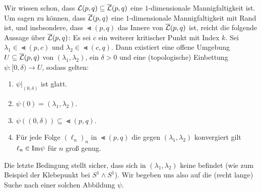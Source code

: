 \begin{bigproof}
    Wir wissen schon, dass ${ \mathcal{L} } (p, q) \subseteq {\overline{\mathcal{L}} }(p, q)$ eine $1$-dimensionale Mannigfaltigkeit ist. 
    Um sagen zu können, dass ${\overline{\mathcal{L}} } (p, q)$ eine $1$-dimensionale Mannigfaltigkeit mit Rand ist, und 
    insbsondere, dass $\Lt (p, q)$ das Innere von ${\overline{\mathcal{L}} }(p, q)$ ist, reicht die folgende Aussage über 
    ${\overline{\mathcal{L}} }(p, q)$:
    Es sei $c$ ein weiterer kritischer Punkt mit Index $k$.
    Sei $\lambda_1 \in \Lt (p, c)$ und $\lambda_2 \in \Lt (c, q)$. Dann existiert eine offene Umgebung
    $U \subseteq {\overline{\mathcal{L}} } (p, q)$ von $(\lambda_1, \lambda_2)$, ein $\delta > 0$ und eine (topologische)
    Einbettung $\psi \colon [0, \delta) \to U$, sodass gelten: 
    \begin{enumerate}
        \item $\psi|_{(0, \delta)}$ ist glatt.
        \item $\psi(0) = (\lambda_1, \lambda_2)$.
        \item $\psi((0, \delta)) \subseteq \Lt (p, q)$.
        \item Für jede Folge $(\ell_n)_n$ in $\Lt (p, q)$ die gegen $(\lambda_1, \lambda_2)$ konvergiert 
            gilt $\ell_n \in { \operatorname{Im} } \psi$ für $n$ groß genug.
    \end{enumerate} 
    Die letzte Bedingung stellt sicher, dass sich in $(\lambda_1, \lambda_2)$ keine 
     befindet (wie zum Beispiel der Klebepunkt bei $S^1 \wedge S^1$).
    Wir begeben uns also auf die (recht lange) Suche nach einer solchen Abbildung $\psi$. 


\end{bigproof}
